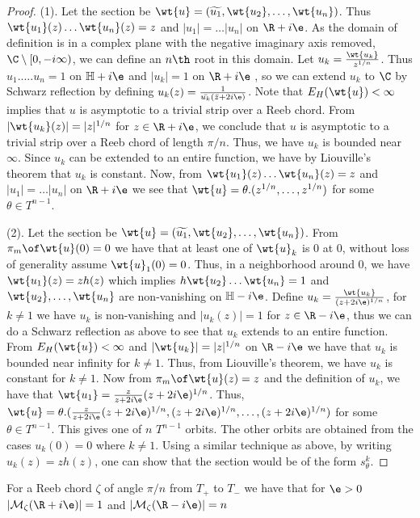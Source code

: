 \begin{proof}
(1). Let the section be $\wt{u}= ({\widetilde{u_1},\wt{u_2},\dots ,\wt{u_n}})$. Thus $\wt{u_1}(z)\dots \wt{u_n}(z) = z$ and $|u_1| = \dots |u_n|$ on $\R + i\e$. As the domain of definition is in a complex plane with the negative imaginary axis removed, $\C\setminus[0,-i\infty)$, we can define an $n\th$ root in this domain. Let $u_k= \frac{\wt{u_k}}{z^{1/n}}$. Thus $u_1.\dots.u_n=1$ on $\mathbb{H}+i\e$ and $|u_k| = 1 $ on $\R + i\e$ , so we can extend $u_k$ to $\C$ by Schwarz reflection by defining $u_k(z) = \frac{1}{\bar{u_k}(\bar{z}+2i\e)}$. Note that $E_H(\wt{u}) < \infty $ implies that $u$ is asymptotic to a trivial strip over a Reeb chord. From $|\wt{u_k} (z)| =  |z|^{1/n}$ for $z \in \R + i\e$, we conclude that $u$ is asymptotic to a trivial strip over a Reeb chord of length $\pi/n$. Thus, we have $u_k$ is bounded near $\infty$. Since $u_k$ can be extended to an entire function, we have by Liouville's theorem that $u_k$ is constant. Now, from $\wt{u_1}(z)\dots \wt{u_n}(z) = z$ and $|u_1| = \dots |u_n|$ on $\R + i\e$ we see that $\wt{u}=\theta.(z^{1/n},\dots,z^{1/n})$ for some $\theta \in T^{n-1}$.


(2). Let the section be $\wt{u}= ({\widetilde{u_1},\wt{u_2},\dots ,\wt{u_n}})$. From $\pi_m\of \wt{u} (0) = 0 $ we have that at least one of $\wt{u}_k$ is 0 at 0, without loss of generality assume $\wt{u}_1(0)=0$. Thus, in a neighborhood around 0, we have $\wt{u_1}(z) = zh(z)$ which implies $h\wt{u_2}\dots \wt{u_n}=1$ and $\wt{u_2},\dots,\wt{u_n}$ are non-vanishing on $\mathbb{H}-i\e$.  Define $u_k = \frac{\wt{u_k}}{(z+2i\e)^{1/n}}$, for $k\neq 1$ we have $u_k$ is non-vanishing and $|u_k(z)|= 1$ for $z\in \R-i\e$, thus we can do a Schwarz reflection as above to see that $u_k$ extends to an entire function. From $E_H(\wt{u}) < \infty$ and $|\wt{u_k}| = |z|^{1/n}$ on $\R -i\e$ we have that $u_k$ is bounded near infinity for $k\neq1$. Thus, from Liouville's theorem, we have $u_k$ is constant for $k \neq 1$. Now from $\pi_m \of \wt{u} (z) = z$ and the definition of $u_k$, we have that $\wt{u_1} = \frac{z}{z+2i\e} (z+2i\e)^{1/n}$. Thus, $\wt{u} = \theta.  (\frac{z}{z+2i\e} (z+2i\e)^{1/n},(z+2i\e)^{1/n},\dots,(z+2i\e)^{1/n}) $ for some $\theta \in T^{n-1}$. This gives one of $n$ $T^{n-1}$ orbits. The other orbits are obtained from the cases $u_k(0)=0$ where $k \neq 1$. Using a similar technique as above, by writing $u_k (z) = z h(z)$, one can show that the section would be of the form $s^k_\theta$.



\end{proof}
\begin{cor}\label{corr:disccount}
For a  Reeb chord $\zeta$ of angle $\pi/n$ from $T_+$ to $T_-$ we have that for $\e>0$ $|\mathcal{M}_\zeta (\R + i\e)| =1 $ and $|\mathcal{M}_\zeta (\R - i\e)| = n $
\end{cor}



